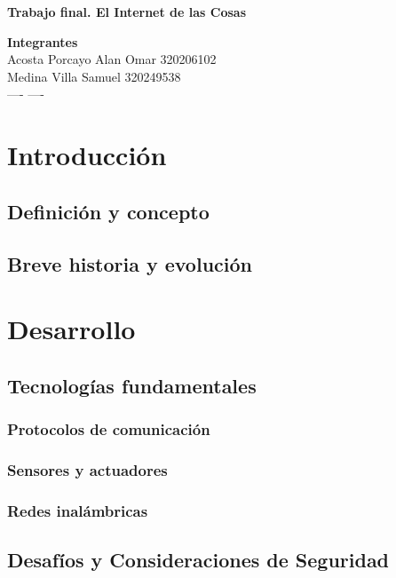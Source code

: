 \documentclass[12pt]{article}
\newcommand{\linejump}{\hfill \break}
\begin{document}
  \begin{center}
    \linejump
    \LARGE \textbf{Trabajo final. El Internet de las Cosas}
  \end{center}

  \begin{flushright}
    \textbf{Integrantes} \\
    Acosta Porcayo Alan Omar 320206102 \\
    Medina Villa Samuel 320249538 \\
    ---- ---- 
  \end{flushright}

  \section*{Introducción}
  \subsection*{Definición y concepto}


  \subsection*{Breve historia y evolución}


  \section*{Desarrollo}
  \subsection*{Tecnologías fundamentales}
  \subsubsection*{Protocolos de comunicación}


  \subsubsection*{Sensores y actuadores}


  \subsubsection*{Redes inalámbricas}


  \subsection*{Desafíos y Consideraciones de Seguridad}
\end{document}
